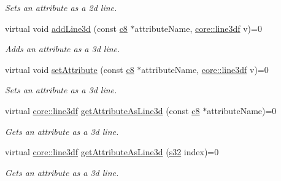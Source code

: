 \begin{DoxyCompactItemize}
\begin{DoxyCompactList}\small\item\em Sets an attribute as a 2d line. \end{DoxyCompactList}\item 
\mbox{\label{classirr_1_1io_1_1IAttributes_abbfb8cb612936e2f9c4b6728deb4b0c9}} 
virtual void \hyperlink{classirr_1_1io_1_1IAttributes_abbfb8cb612936e2f9c4b6728deb4b0c9}{add\+Line3d} (const \hyperlink{namespaceirr_a9395eaea339bcb546b319e9c96bf7410}{c8} $\ast$attribute\+Name, \hyperlink{namespaceirr_1_1core_acadb288f9aca3bf2d1222abcdf77114e}{core\+::line3df} v)=0
\begin{DoxyCompactList}\small\item\em Adds an attribute as a 3d line. \end{DoxyCompactList}\item 
\mbox{\label{classirr_1_1io_1_1IAttributes_a0f7d2a6c68c2faa0933189c3d6a55913}} 
virtual void \hyperlink{classirr_1_1io_1_1IAttributes_a0f7d2a6c68c2faa0933189c3d6a55913}{set\+Attribute} (const \hyperlink{namespaceirr_a9395eaea339bcb546b319e9c96bf7410}{c8} $\ast$attribute\+Name, \hyperlink{namespaceirr_1_1core_acadb288f9aca3bf2d1222abcdf77114e}{core\+::line3df} v)=0
\begin{DoxyCompactList}\small\item\em Sets an attribute as a 3d line. \end{DoxyCompactList}\item 
virtual \hyperlink{namespaceirr_1_1core_acadb288f9aca3bf2d1222abcdf77114e}{core\+::line3df} \hyperlink{classirr_1_1io_1_1IAttributes_ab6da415d43f2a4211026b191b17b0938}{get\+Attribute\+As\+Line3d} (const \hyperlink{namespaceirr_a9395eaea339bcb546b319e9c96bf7410}{c8} $\ast$attribute\+Name)=0
\begin{DoxyCompactList}\small\item\em Gets an attribute as a 3d line. \end{DoxyCompactList}\item 
virtual \hyperlink{namespaceirr_1_1core_acadb288f9aca3bf2d1222abcdf77114e}{core\+::line3df} \hyperlink{classirr_1_1io_1_1IAttributes_ab6cc3141c7d5bd82ade97c7da899d025}{get\+Attribute\+As\+Line3d} (\hyperlink{namespaceirr_ac66849b7a6ed16e30ebede579f9b47c6}{s32} index)=0
\begin{DoxyCompactList}\small\item\em Gets an attribute as a 3d line. \end{DoxyCompactList}\item 

\end{DoxyCompactItemize}
